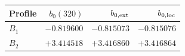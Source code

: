 \begin{tabular}{@{}lrrr@{}}
\toprule
Profile & $b_0(320)$ & $b_{0,\mathrm{ext}}$ & $b_{0,\mathrm{loc}}$ \\
\midrule
$B_1$ & $-0.819600$ & $-0.815073$ & $-0.815076$ \\
$B_2$ & $+3.414518$ & $+3.416860$ & $+3.416864$ \\
\bottomrule
\end{tabular}
